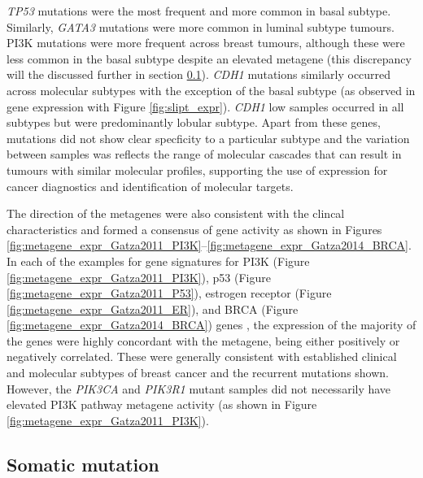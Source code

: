 \textit{TP53} mutations were the most frequent and more common in basal subtype. Similarly, \textit{GATA3} mutations were more common in luminal subtype tumours. PI3K mutations were more frequent across breast tumours, although these were less common in the basal subtype despite an elevated metagene (this discrepancy will the discussed further in section \ref{chapt3:metagene_mut}). \textit{CDH1} mutations similarly occurred across molecular subtypes with the exception of the basal subtype (as observed in gene expression with Figure \ref{fig:slipt_expr}). \textit{CDH1} low samples occurred in all subtypes but were predominantly lobular subtype. Apart from these genes, mutations did not show clear specficity to a particular subtype and the variation between samples was reflects the range of molecular cascades that can result in tumours with similar molecular profiles, supporting the use of expression for cancer diagnostics and identification of molecular targets. 

The direction of the metagenes were also consistent with the clincal characteristics and formed a consensus of gene activity as shown in Figures \ref{fig:metagene_expr_Gatza2011_PI3K}\nobreakdash--\ref{fig:metagene_expr_Gatza2014_BRCA}. In each of the examples for gene signatures for PI3K (Figure \ref{fig:metagene_expr_Gatza2011_PI3K}), p53 (Figure \ref{fig:metagene_expr_Gatza2011_P53}), estrogen receptor (Figure \ref{fig:metagene_expr_Gatza2011_ER}), and BRCA (Figure \ref{fig:metagene_expr_Gatza2014_BRCA}) genes \citep{Gatza2011, Gatza2014}, the expression of the majority of the genes were highly concordant with the metagene, being either positively or negatively correlated. These were generally consistent with established clinical and molecular subtypes of breast cancer and the recurrent mutations shown. However, the \textit{PIK3CA} and \textit{PIK3R1} mutant samples did not necessarily have elevated PI3K pathway metagene activity (as shown in Figure \ref{fig:metagene_expr_Gatza2011_PI3K}).  

\FloatBarrier

\subsection{Somatic mutation}  \label{chapt3:metagene_mut}

